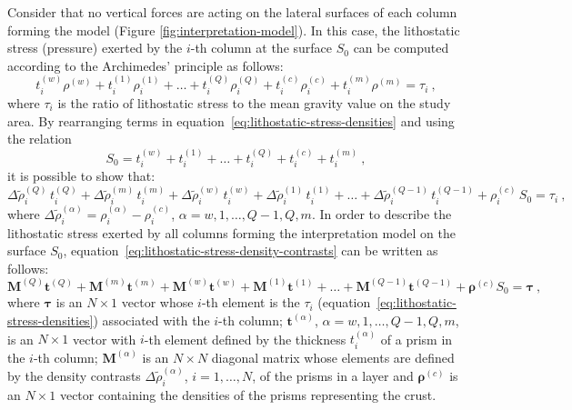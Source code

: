 \documentclass[manuscript]{geophysics}
\begin{document}
Consider that no vertical forces are acting on the lateral surfaces of 
each column forming the model (Figure \ref{fig:interpretation-model}). In this case, 
the lithostatic stress (pressure) exerted by the $i$-th column at the surface $S_{0}$
can be computed according to the Archimedes' principle as follows:
\begin{equation}
t^{(w)}_{i} \rho^{(w)} + t^{(1)}_{i} \rho^{(1)}_{i} + \dots + 
t^{(Q)}_{i} \rho^{(Q)}_{i} + t^{(c)}_{i} \rho^{(c)}_{i} + t^{(m)}_{i} \rho^{(m)} 
= \tau_{i} \: ,
\label{eq:lithostatic-stress-densities}
\end{equation}
where $\tau_{i}$ is the ratio of lithostatic stress to the mean gravity 
value on the study area.
By rearranging terms in equation~\ref{eq:lithostatic-stress-densities} 
and using the relation
\begin{equation}
S_{0} = t^{(w)}_{i} + t^{(1)}_{i} + \dots + t^{(Q)}_{i} + t^{(c)}_{i} + t^{(m)}_{i} \: ,
\label{eq:S0}
\end{equation}
it is possible to show that:
\begin{equation}
\Delta \tilde{\rho}^{(Q)}_{i} \, t^{(Q)}_{i} + 
\Delta \tilde{\rho}^{(m)}_{i} \, t^{(m)}_{i} + 
\Delta \tilde{\rho}^{(w)}_{i} \, t^{(w)}_{i} + 
\Delta \tilde{\rho}^{(1)}_{i} \, t^{(1)}_{i} +
\dots + 
\Delta \tilde{\rho}^{(Q-1)}_{i} \, t^{(Q-1)}_{i} +
\rho^{(c)}_{i} \, S_{0} = \tau_{i} \: ,
\label{eq:lithostatic-stress-density-contrasts}
\end{equation}
where $\Delta \tilde{\rho}^{(\alpha)}_{i} = \rho^{(\alpha)}_{i} - \rho^{(c)}_{i}$, 
$\alpha = w, 1, \dots, Q-1, Q, m$.
In order to describe the lithostatic stress exerted by all columns forming the
interpretation model on the surface $S_{0}$, 
equation~\ref{eq:lithostatic-stress-density-contrasts} 
can be written as follows:
\begin{equation}
\mathbf{M}^{(Q)} \mathbf{t}^{(Q)} + \mathbf{M}^{(m)} \mathbf{t}^{(m)} + \mathbf{M}^{(w)}
\mathbf{t}^{(w)} + \mathbf{M}^{(1)} \mathbf{t}^{(1)} + \dots + \mathbf{M}^{(Q-1)}
\mathbf{t}^{(Q-1)} + \boldsymbol{\rho}^{(c)} S_{0} = \boldsymbol{\tau} \: ,
\label{eq:lithostatic-stress-matrix}
\end{equation}
where $\boldsymbol{\tau}$ is an $N \times 1$ vector whose $i$-th element is
the $\tau_{i}$ (equation~\ref{eq:lithostatic-stress-densities}) associated with
the $i$-th column; $\mathbf{t}^{(\alpha)}$, $\alpha = w, 1, \dots, Q-1, Q, m$, 
is an $N \times 1$ vector with $i$-th element defined by the thickness 
$t^{(\alpha)}_{i}$ of a prism in the $i$-th column; $\mathbf{M}^{(\alpha)}$ is an $N \times N$ diagonal 
matrix whose elements are defined by the density contrasts 
$\Delta \tilde{\rho}^{(\alpha)}_{i}$, $i = 1, \dots, N$, of the prisms in a layer and
$\boldsymbol{\rho}^{(c)}$ is an $N \times 1$ vector containing the densities of the prisms
representing the crust. 
\end{document}

